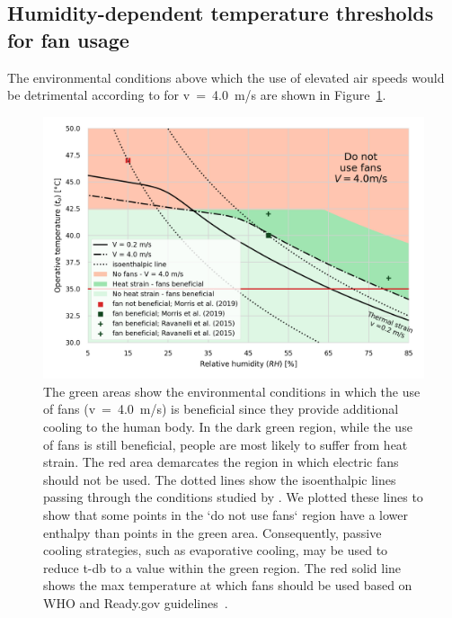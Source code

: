 \subsection{Humidity-dependent temperature thresholds for fan usage}\label{subsec:model-validation-experimental-data}

The environmental conditions above which the use of elevated air speeds would be detrimental according to  for \ac{v}~=~4.0~m/s are shown in Figure~\ref{fig:use_fans_experimental}.

\begin{figure}[hbt!]
    \centering
    \includegraphics[width=\textwidth]{figures/summary_use_fans_comparison_experimental}
    \caption{The green areas show the environmental conditions in which the use of fans (\ac{v}~=~4.0~m/s) is beneficial since they provide additional cooling to the human body.
    In the dark green region, while the use of fans is still beneficial, people are most likely to suffer from heat strain.
    The red area demarcates the region in which electric fans should not be used.
    The dotted lines show the isoenthalpic lines passing through the conditions studied by .
    We plotted these lines to show that some points in the `do not use fans` region have a lower enthalpy than points in the green area. 
    Consequently, passive cooling strategies, such as evaporative cooling, may be used to reduce \ac{t-db} to a value within the green region.
    The red solid line shows the max temperature at which fans should be used based on WHO and Ready.gov guidelines~\cite{WMO2015, ExtremeH66:online}.
    }
    \label{fig:use_fans_experimental}
\end{figure}

